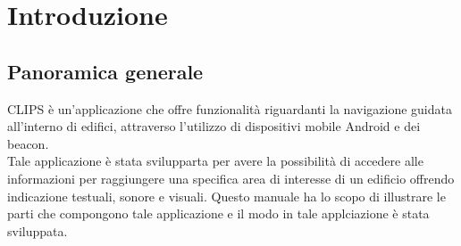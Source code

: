 \documentclass[../ManualeSviluppatore.tex]{subfiles}
\begin{document}
\section{Introduzione}
	\subsection{Panoramica generale}
	CLIPS è un'applicazione che offre funzionalità riguardanti la navigazione guidata all'interno di edifici, attraverso l'utilizzo di dispositivi mobile Android e dei beacon. \\
	Tale applicazione è stata svilupparta per avere la possibilità di accedere alle informazioni per raggiungere una specifica area di interesse di un edificio offrendo indicazione testuali, sonore e visuali.
	Questo manuale ha lo scopo di illustrare le parti che compongono tale applicazione e il modo in tale applciazione è stata sviluppata.
\end{document}
